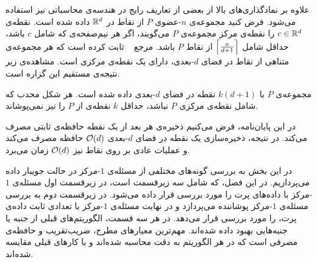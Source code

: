  

علاوه بر نمادگذاری‌های بالا از بعضی از تعاریف رایج در هندسه‌ی محاسباتی نیز‌ استفاده می‌شود. فرض کنید مجموعه‌ی $n$-عضوی $P$ از نقاط در $\mathbb{R}^d$ داده شده است. نقطه‌ی $c \in \mathbb{R}^d$ را نقطه‌ی مرکز مجموعه‌ی $P$ می‌گویند، اگر هر نیم‌صفحه‌ی که شامل $c$ باشد، حداقل شامل $\left\lceil{\frac{n}{d+1}}\right\rceil$ از نقاط $P$ باشد. مرجع ~ ثابت کرده است که هر مجموعه‌ی متناهی از نقاط در فضای $d$-بعدی، دارای یک نقطه‌ی مرکزی است. مشاهده‌ی زیر نتیجه‌ی مستقیم این گزاره است.


مجموعه‌ی $P$ با $k(d+1)$ نقطه در فضای $d$-بعدی داده شده است. هر شکل محدب که شامل نقطه‌ی مرکزی $P$ نباشد، حداقل $k$ نقطه‌ی از $P$ را نیز نمی‌پوشاند.


در این پایان‌نامه، فرض می‌کنیم ذخیره‌ی هر بعد از یک نقطه‌ حافظه‌ی ثابتی مصرف می‌کند. در نتیجه، ذخیره‌سازی یک نقطه در فضای $d$-بعدی $\mathcal{O}(d)$ حافظه مصرف می‌کند و عملیات عادی بر روی نقاط نیز‌ $\mathcal{O}(d)$ زمان می‌برد.


در این بخش به بررسی گونه‌های مختلفی از مسئله‌ی $1$-مرکز در حالت جویبار داده می‌پردازیم. در این فصل، که شامل سه زیرقسمت است، در زیرقسمت اول مسئله‌ی $1$-مرکز با داده‌های پرت را مورد بررسی قرار داده می‌شود. در زیرقسمت دوم به بررسی مسئله‌ی $1$-مرکز پوشاننده می‌پردازد و در نهایت مسئله‌ی $1$-مرکز با تعدادی ثابت داده‌ی پرت، را مورد بررسی قرار می‌دهد. در هر سه قسمت‌، الگوریتم‌های قبلی از جنبه‌ یا جنبه‌هایی بهبود داده شده‌اند. مهم‌ترین معیار‌های مطرح، ضریب‌تقریب و حافظه‌ی مصرفی است که در هر الگوریتم به دقت محاسبه شده‌اند و با کارهای قبلی مقایسه شده‌اند.













